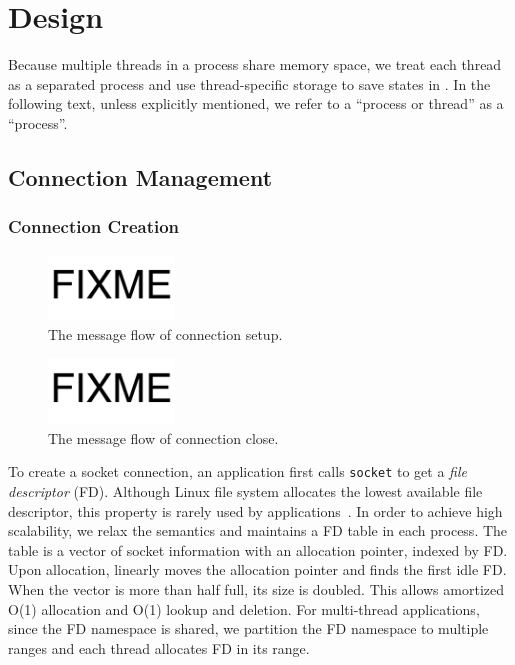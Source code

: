 \section{Design}
\label{sec:intra-server}

Because multiple threads in a process share memory space, we treat each thread as a separated process and use thread-specific storage to save states in \libipc. In the following text, unless explicitly mentioned, we refer to a ``process or thread'' as a ``process''.

\subsection{Connection Management}
\label{subsec:socket-api}


\subsubsection{Connection Creation}
\label{subsubsec:connection_management}

\begin{figure}[t]
	\centering
	\includegraphics[width=0.3\textwidth]{images/fixme}
	\caption{The message flow of connection setup.}
	\label{fig:conn-setup}
\end{figure}

\begin{figure}[t]
	\centering
	\includegraphics[width=0.3\textwidth]{images/fixme}
	\caption{The message flow of connection close.}
	\label{fig:conn-close}
\end{figure}

To create a socket connection, an application first calls \texttt{socket} to get a \textit{file descriptor} (FD). Although Linux file system allocates the lowest available file descriptor, this property is rarely used by applications~\cite{han2012megapipe,huang2017high}. In order to achieve high scalability, we relax the semantics and maintains a FD table in each process. The table is a vector of socket information with an allocation pointer, indexed by FD. Upon allocation, \libipc{} linearly moves the allocation pointer and finds the first idle FD. When the vector is more than half full, its size is doubled. This allows amortized O(1) allocation and O(1) lookup and deletion.
For multi-thread applications, since the FD namespace is shared, we partition the FD namespace to multiple ranges and each thread allocates FD in its range.

